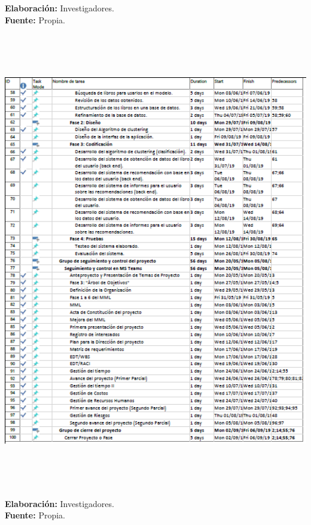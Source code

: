 \documentclass[12pt, a4paper, nofontenc, numbers=endperiod]{apa7}
\begin{document}
{\begin{center}
	\singlespacing\textbf{Elaboración:} Investigadores.\\
	\textbf{Fuente:} Propia.
\end{center}
\newpage
\begin{center}
	\includegraphics[width=14cm,height=20cm]{Imagenes/Figura34}
\end{center}
\vspace*{-1cm}
\begin{center}
	\singlespacing\textbf{Elaboración:} Investigadores.\\
	\textbf{Fuente:} Propia.
\end{center}
\newpage
}
\end{document}
